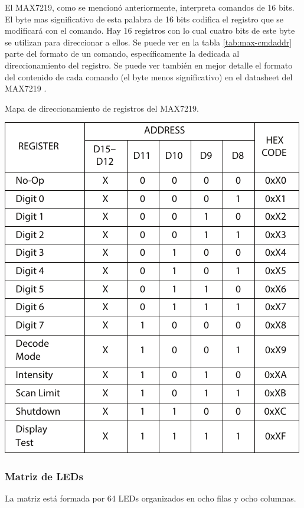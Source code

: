 El MAX7219, como se mencionó anteriormente, interpreta comandos de 16 bits. El byte mas significativo de esta palabra de 16 bits codifica el registro que se modificará con el comando. Hay 16 registros con lo cual cuatro bits de este byte se utilizan para direccionar a ellos. Se puede ver en la tabla \ref{tab:max-cmdaddr} parte del formato de un comando, específicamente la dedicada al direccionamiento del registro. Se puede ver también en mejor detalle el formato del contenido de cada comando (el byte menos significativo) en el datasheet del MAX7219 \cite{MAX7219}.
\begin{table}[htbp]
	\centering
	\caption{Mapa de direccionamiento de registros del MAX7219.}
	\vspace{0.2cm}
	\includegraphics[scale=1]{imagenes/max-cmdaddr.pdf}
	\label{tab:max-cmdaddr}
\end{table}

\subsubsection{Matriz de LEDs} \label{sec:matriz-leds}
La matriz está formada por 64 LEDs organizados en ocho filas y ocho columnas.

